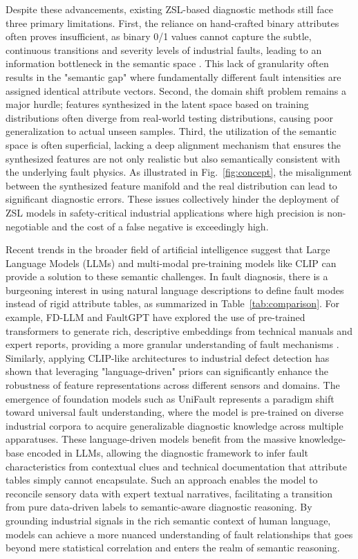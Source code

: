 Despite these advancements, existing ZSL-based diagnostic methods still face three primary limitations. First, the reliance on hand-crafted binary attributes often proves insufficient, as binary 0/1 values cannot capture the subtle, continuous transitions and severity levels of industrial faults, leading to an information bottleneck in the semantic space \cite{KSS2023, Xu2023semantic, Yang2024HVCB}. This lack of granularity often results in the "semantic gap" where fundamentally different fault intensities are assigned identical attribute vectors. Second, the domain shift problem remains a major hurdle; features synthesized in the latent space based on training distributions often diverge from real-world testing distributions, causing poor generalization to actual unseen samples. Third, the utilization of the semantic space is often superficial, lacking a deep alignment mechanism that ensures the synthesized features are not only realistic but also semantically consistent with the underlying fault physics. As illustrated in Fig.~\ref{fig:concept}, the misalignment between the synthesized feature manifold and the real distribution can lead to significant diagnostic errors. These issues collectively hinder the deployment of ZSL models in safety-critical industrial applications where high precision is non-negotiable and the cost of a false negative is exceedingly high.

Recent trends in the broader field of artificial intelligence suggest that Large Language Models (LLMs) and multi-modal pre-training models like CLIP can provide a solution to these semantic challenges. In fault diagnosis, there is a burgeoning interest in using natural language descriptions to define fault modes instead of rigid attribute tables, as summarized in Table~\ref{tab:comparison}. For example, FD-LLM and FaultGPT have explored the use of pre-trained transformers to generate rich, descriptive embeddings from technical manuals and expert reports, providing a more granular understanding of fault mechanisms \cite{FDLLM2025, FaultGPT2025, IADCLIP2024, UniFault2025}. Similarly, applying CLIP-like architectures to industrial defect detection has shown that leveraging "language-driven" priors can significantly enhance the robustness of feature representations across different sensors and domains. The emergence of foundation models such as UniFault represents a paradigm shift toward universal fault understanding, where the model is pre-trained on diverse industrial corpora to acquire generalizable diagnostic knowledge across multiple apparatuses. These language-driven models benefit from the massive knowledge-base encoded in LLMs, allowing the diagnostic framework to infer fault characteristics from contextual clues and technical documentation that attribute tables simply cannot encapsulate. Such an approach enables the model to reconcile sensory data with expert textual narratives, facilitating a transition from pure data-driven labels to semantic-aware diagnostic reasoning. By grounding industrial signals in the rich semantic context of human language, models can achieve a more nuanced understanding of fault relationships that goes beyond mere statistical correlation and enters the realm of semantic reasoning.

